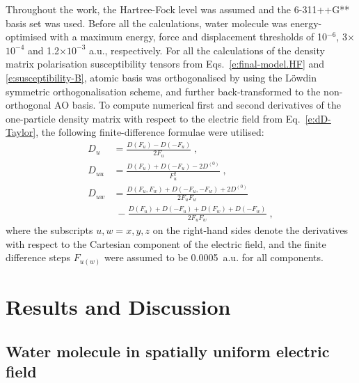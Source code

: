 \documentclass[aip,amsmath,amssymb,reprint,floatfix]{revtex4-1}
\begin{document}
%
Throughout the work, the Hartree\hyp{}Fock level\cite{Roothaan.RevModPhys.1951} was assumed 
and the 6-311++G** basis set\cite{Krishnan.Binkley.Seeger.Pople.JCP.1980}
was used. Before all the calculations, water molecule was energy\hyp{}optimised
with a maximum energy, force and displacement thresholds of 10$^{-6}$, 3$\times$$10^{-4}$ 
and 1.2$\times$$10^{-3}$ a.u., respectively.
For all the calculations of the density matrix polarisation susceptibility tensors
from Eqs.~\eqref{e:final-model.HF} and \eqref{e:susceptibility-B}, 
atomic basis was orthogonalised by using the L{\"o}wdin symmetric orthogonalisation scheme,\cite{Mayer.IJQC.2002}
and further back\hyp{}transformed to the non\hyp{}orthogonal AO basis.
To compute numerical first and second derivatives of the one\hyp{}particle density matrix
with respect to the electric field from Eq.~\eqref{e:dD-Taylor}, 
the following finite\hyp{}difference formulae were utilised:
%
\begin{subequations}\label{e:ff}
  \begin{align}
    D_u    &= \frac{D(F_u) - D(-F_u)}{2F_u} \;,\\
    D_{uu} &= \frac{D(F_u) + D(-F_u) - 2D^{(0)}}{F_u^2} \;,\\
    D_{uw} &= \frac{D(F_u,F_w) + D(-F_u,-F_w) + 2D^{(0)}}{2F_uF_w} \nonumber \\ 
           & \; -\frac{D(F_u) + D(-F_u) + D(F_w) + D(-F_w)}{2F_uF_w} \;,
  \end{align}
\end{subequations}
%
where 
the subscripts $u,w=x,y,z$ on the right\hyp{}hand sides denote the derivatives with respect 
to the Cartesian component of the electric field, and the finite difference
steps $F_{u(w)}$ were assumed to be 0.0005~a.u. for all components. 

\section{\label{s:4}Results and Discussion}

\subsection{\label{ss:41}Water molecule in spatially uniform electric field}
\end{document}
